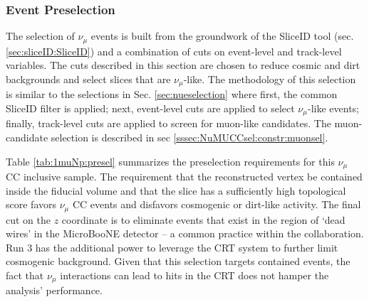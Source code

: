 \subsubsection{Event Preselection}
\label{sssec:NuMUCCsel:constr:preselec}

\par The selection of $\nu_{\mu}$ events is built from the groundwork of the SliceID tool (sec. \ref{sec:sliceID:SliceID}) and a combination of cuts on event-level and track-level variables. The cuts described in this section are chosen to reduce cosmic and dirt backgrounds and select slices that are $\nu_{\mu}$-like. The methodology of this selection is similar to the selections in Sec. \ref{sec:nueselection} where first, the common SliceID filter is applied; next, event-level cuts are applied to select $\nu_{\mu}$-like events; finally, track-level cuts are applied to screen for muon-like candidates. The muon-candidate selection is described in sec \ref{sssec:NuMUCCsel:constr:muonsel}.

\par Table \ref{tab:1muNp:presel} summarizes the preselection requirements for this $\nu_{\mu}$ CC inclusive sample. The requirement that the reconstructed vertex be contained inside the fiducial volume and that the slice has a sufficiently high topological score favors $\nu_{\mu}$ CC events and disfavors cosmogenic or dirt-like activity. The final cut on the $z$ coordinate is to eliminate events that exist in the region of `dead wires' in the MicroBooNE detector -- a common practice within the collaboration. Run 3 has the additional power to leverage the CRT system to further limit cosmogenic background. Given that this selection targets contained events, the fact that $\nu_{\mu}$ interactions can lead to hits in the CRT does not hamper the analysis' performance.


